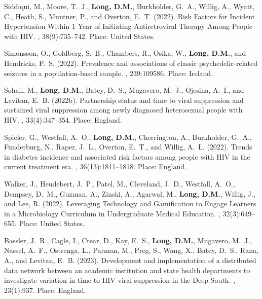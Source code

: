 \begin{thebibliography}{}
Siddiqui, M., Moore, T.~J., \textbf{Long, D.M.}, Burkholder, G.~A., Willig, A., Wyatt,
  C., Heath, S., Muntner, P., and Overton, E.~T. (2022).
\newblock Risk {Factors} for {Incident} {Hypertension} {Within} 1 {Year} of
  {Initiating} {Antiretroviral} {Therapy} {Among} {People} with {HIV}.
, 38(9):735--742.
\newblock Place: United States.

Simonsson, O., Goldberg, S.~B., Chambers, R., Osika, W., \textbf{Long, D.M.}, and
  Hendricks, P.~S. (2022).
\newblock Prevalence and associations of classic psychedelic-related seizures
  in a population-based sample.
, 239:109586.
\newblock Place: Ireland.



Sohail, M., \textbf{Long, D.M.}, Batey, D.~S., Mugavero, M.~J., Ojesina, A.~I., and
  Levitan, E.~B. (2022b).
\newblock Partnership status and time to viral suppression and sustained viral
  suppression among newly diagnosed heterosexual people with {HIV}.
, 33(4):347--354.
\newblock Place: England.

Spieler, G., Westfall, A.~O., \textbf{Long, D.M.}, Cherrington, A., Burkholder, G.~A.,
  Funderburg, N., Raper, J.~L., Overton, E.~T., and Willig, A.~L. (2022).
\newblock Trends in diabetes incidence and associated risk factors among people
  with {HIV} in the current treatment era.
, 36(13):1811--1818.
\newblock Place: England.

Walker, J., Heudebert, J.~P., Patel, M., Cleveland, J.~D., Westfall, A.~O.,
  Dempsey, D.~M., Guzman, A., Zinski, A., Agarwal, M., \textbf{Long, D.M.}, Willig, J.,
  and Lee, R. (2022).
\newblock Leveraging {Technology} and {Gamification} to {Engage} {Learners} in
  a {Microbiology} {Curriculum} in {Undergraduate} {Medical} {Education}.
, 32(3):649--655.
\newblock Place: United States.

Bassler, J.~R., Cagle, I., Crear, D., Kay, E.~S., \textbf{Long, D.M.}, Mugavero, M.~J.,
  Nassel, A.~F., Ostrenga, L., Parman, M., Preg, S., Wang, X., Batey, D.~S.,
  Rana, A., and Levitan, E.~B. (2023).
\newblock Development and implementation of a distributed data network between
  an academic institution and state health departments to investigate variation
  in time to {HIV} viral suppression in the {Deep} {South}.
, 23(1):937.
\newblock Place: England.


\end{thebibliography}
